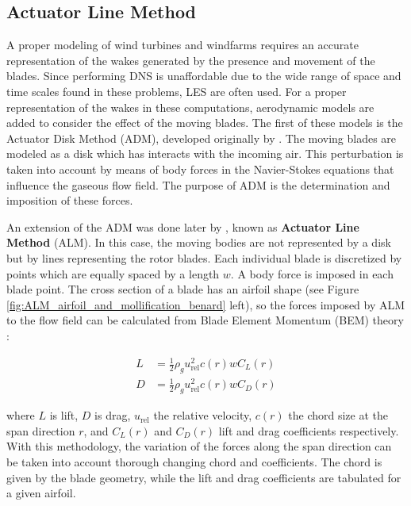 \subsection{Actuator Line Method}

A proper modeling of wind turbines and windfarms requires an accurate representation of the wakes generated by the presence and movement of the blades. Since performing DNS is unaffordable due to the wide range of space and time scales found in these problems, LES are often used. For a proper representation of the wakes in these computations, aerodynamic models are added to consider the effect of the moving blades. The first of these models is the Actuator Disk Method (ADM), developed originally by . The moving blades are modeled as a disk which has interacts with the incoming air. This perturbation is taken into account by means of body forces in the Navier-Stokes equations that influence the gaseous flow field. The purpose of ADM is the determination and imposition of these forces.

An extension of the ADM was done later by , known as \textbf{Actuator Line Method} (ALM). In this case, the moving bodies are not represented by a disk but by lines representing the rotor blades. Each individual blade is discretized by points which are equally spaced by a length $w$. A body force is imposed in each blade point. The cross section of a blade has an airfoil shape (see Figure \ref{fig:ALM_airfoil_and_mollification_benard} left), so the forces imposed by ALM to the flow field can be calculated from Blade Element Momentum (BEM) theory :

\begin{subequations}
\label{eq:ALM_lift_drag_definitions}
\begin{align}
L &= \frac{1}{2} \rho_g u_\mathrm{rel}^2 c \left( r \right) w C_L \left( r \right) \\
D &= \frac{1}{2} \rho_g u_\mathrm{rel}^2 c \left( r \right) w C_D \left( r \right)
\end{align}
\end{subequations}

where $L$ is lift, $D$ is drag, $u_\mathrm{rel}$ the relative velocity, $c \left( r \right)$ the chord size at the span direction $r$, and $C_L \left( r \right)$ and $C_D \left( r \right)$ lift and drag coefficients respectively. With this methodology, the variation of the forces along the span direction can be taken into account thorough changing chord and coefficients. The chord is given by the blade geometry, while the lift and drag coefficients are tabulated for a given airfoil.



